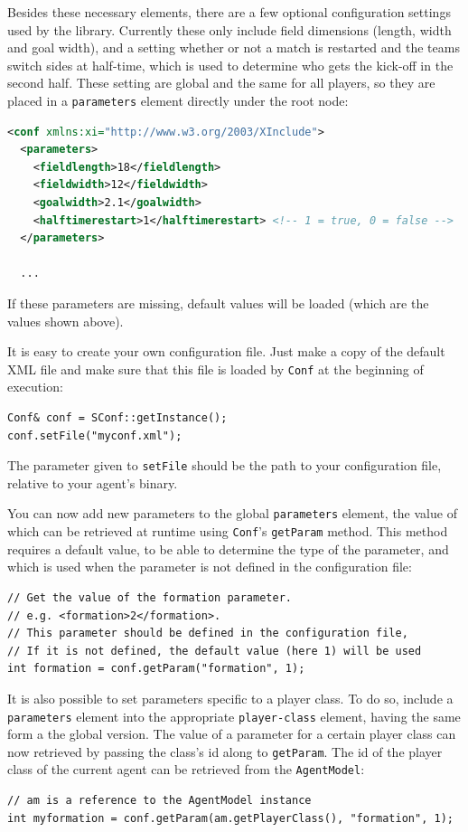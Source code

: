 \lstset{numbers=none}

Besides these necessary elements, there are a few optional configuration settings used by the library. Currently these only include field dimensions (length, width and goal width), and a setting whether or not a match is restarted and the teams switch sides at half-time, which is used to determine who gets the kick-off in the second half. These setting are global and the same for all players, so they are placed in a {\tt parameters} element directly under the root node:
\begin{lstlisting}[frame=single,language=xml]
<conf xmlns:xi="http://www.w3.org/2003/XInclude">
  <parameters>
    <fieldlength>18</fieldlength>
    <fieldwidth>12</fieldwidth>
    <goalwidth>2.1</goalwidth>
    <halftimerestart>1</halftimerestart> <!-- 1 = true, 0 = false -->
  </parameters>
  
  ...
\end{lstlisting}
If these parameters are missing, default values will be loaded (which are the values shown above).

It is easy to create your own configuration file. Just make a copy of the default XML file and make sure that this file is loaded by {\tt Conf} at the beginning of execution:
\begin{lstlisting}[frame=single]
Conf& conf = SConf::getInstance();
conf.setFile("myconf.xml");
\end{lstlisting}
The parameter given to {\tt setFile} should be the path to your configuration file, relative to your agent's binary.

You can now add new parameters to the global {\tt parameters} element, the value of which can be retrieved at runtime using {\tt Conf}'s {\tt getParam} method. This method requires a default value, to be able to determine the type of the parameter, and which is used when the parameter is not defined in the configuration file:
\begin{lstlisting}[frame=single]
// Get the value of the formation parameter.
// e.g. <formation>2</formation>.
// This parameter should be defined in the configuration file,
// If it is not defined, the default value (here 1) will be used
int formation = conf.getParam("formation", 1);
\end{lstlisting}

It is also possible to set parameters specific to a player class. To do so, include a {\tt parameters} element into the appropriate {\tt player-class} element, having the same form a the global version. The value of a parameter for a certain player class can now retrieved by passing the class's id along to {\tt getParam}. The id of the player class of the current agent can be retrieved from the {\tt AgentModel}:
\begin{lstlisting}[frame=single]
// am is a reference to the AgentModel instance
int myformation = conf.getParam(am.getPlayerClass(), "formation", 1);
\end{lstlisting}

